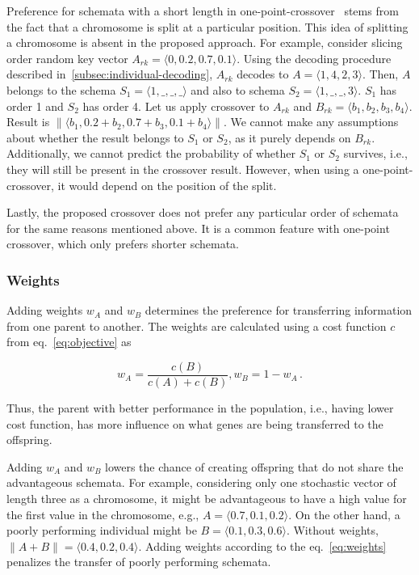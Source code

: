 Preference for schemata with a short length in one-point-crossover~\cite{hollandAdaptationNaturalArtificial1975}
stems from the fact that a chromosome is split at a particular position.
This idea of splitting a chromosome is absent in the proposed approach.
For example, consider slicing order random key vector \mbox{$A_{rk} = \langle 0, 0.2, 0.7, 0.1 \rangle$}.
Using the decoding procedure described in~\ref{subsec:individual-decoding},
$A_{rk}$ decodes to $A = \langle 1, 4, 2, 3 \rangle$.
Then, $A$ belongs to the schema $S_1 = \langle 1, \_, \_, \_\rangle$ and also to schema $S_2 = \langle 1, \_, \_, 3 \rangle$.
$S_1$ has order 1 and $S_2$ has order 4.
Let us apply crossover to $A_{rk}$ and $B_{rk} = \langle b_1, b_2, b_3, b_4 \rangle$.
Result is $\|\langle b_1, 0.2+b_2, 0.7+b_3, 0.1+b_4 \rangle\|$.
We cannot make any assumptions about whether the result belongs to $S_1$ or $S_2$, as it purely depends on $B_{rk}$.
Additionally, we cannot predict the probability of whether $S_1$ or $S_2$ survives, i.e., they will still be present in the crossover result.
However, when using a one-point-crossover, it would depend on the position of the split.

Lastly, the proposed crossover does not prefer any particular order of schemata for the same reasons mentioned above.
It is a common feature with one-point crossover, which only prefers shorter schemata.

\subsubsection*{Weights}
Adding weights $w_A$ and $w_B$ determines the preference for transferring information from one parent to another.
The weights are calculated using a cost function $c$ from eq.~\ref{eq:objective} as

\begin{equation}
    w_A = \dfrac{c(B)}{c(A)+{c(B)}}, w_B = 1 - w_A\,.
    \label{eq:weights}
\end{equation}

Thus, the parent with better performance in the population, i.e., having lower cost function,
has more influence on what genes are being transferred to the offspring.

Adding $w_A$ and $w_B$ lowers the chance of creating offspring that do not share the advantageous schemata.
For example, considering only one stochastic vector of length three as a chromosome,
it might be advantageous to have a high value for the first value in the chromosome, e.g., \mbox{$A=\langle 0.7, 0.1, 0.2 \rangle$}.
On the other hand, a poorly performing individual might be $B=\langle 0.1, 0.3, 0.6 \rangle$.
Without weights, $\| A+B\| = \langle 0.4, 0.2 , 0.4 \rangle$.
Adding weights according to the eq.~\ref{eq:weights} penalizes the transfer of poorly performing schemata.

